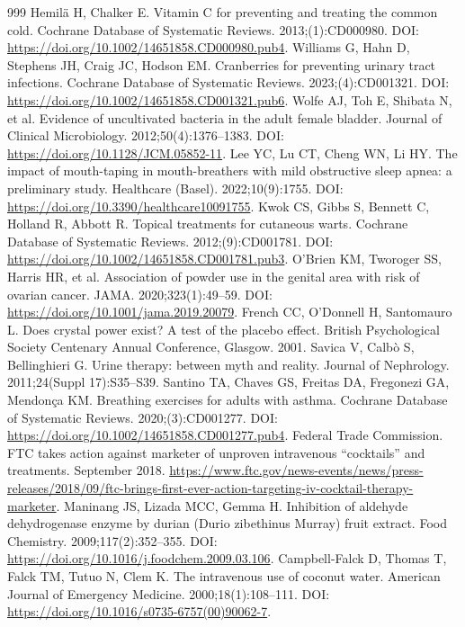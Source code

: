 \documentclass[11pt,oneside]{book}
\begin{document}
\begin{thebibliography}{999}
Hemil\"a H, Chalker E. Vitamin C for preventing and treating the common cold. Cochrane Database of Systematic Reviews. 2013;(1):CD000980. DOI: \url{https://doi.org/10.1002/14651858.CD000980.pub4}.
Williams G, Hahn D, Stephens JH, Craig JC, Hodson EM. Cranberries for preventing urinary tract infections. Cochrane Database of Systematic Reviews. 2023;(4):CD001321. DOI: \url{https://doi.org/10.1002/14651858.CD001321.pub6}.
Wolfe AJ, Toh E, Shibata N, et al. Evidence of uncultivated bacteria in the adult female bladder. Journal of Clinical Microbiology. 2012;50(4):1376--1383. DOI: \url{https://doi.org/10.1128/JCM.05852-11}.
Lee YC, Lu CT, Cheng WN, Li HY. The impact of mouth-taping in mouth-breathers with mild obstructive sleep apnea: a preliminary study. Healthcare (Basel). 2022;10(9):1755. DOI: \url{https://doi.org/10.3390/healthcare10091755}.
Kwok CS, Gibbs S, Bennett C, Holland R, Abbott R. Topical treatments for cutaneous warts. Cochrane Database of Systematic Reviews. 2012;(9):CD001781. DOI: \url{https://doi.org/10.1002/14651858.CD001781.pub3}.
O'Brien KM, Tworoger SS, Harris HR, et al. Association of powder use in the genital area with risk of ovarian cancer. JAMA. 2020;323(1):49--59. DOI: \url{https://doi.org/10.1001/jama.2019.20079}.
French CC, O'Donnell H, Santomauro L. Does crystal power exist? A test of the placebo effect. British Psychological Society Centenary Annual Conference, Glasgow. 2001.
Savica V, Calb\`o S, Bellinghieri G. Urine therapy: between myth and reality. Journal of Nephrology. 2011;24(Suppl 17):S35--S39.
Santino TA, Chaves GS, Freitas DA, Fregonezi GA, Mendon\c{c}a KM. Breathing exercises for adults with asthma. Cochrane Database of Systematic Reviews. 2020;(3):CD001277. DOI: \url{https://doi.org/10.1002/14651858.CD001277.pub4}.
Federal Trade Commission. FTC takes action against marketer of unproven intravenous ``cocktails'' and treatments. September 2018. \url{https://www.ftc.gov/news-events/news/press-releases/2018/09/ftc-brings-first-ever-action-targeting-iv-cocktail-therapy-marketer}.
Maninang JS, Lizada MCC, Gemma H. Inhibition of aldehyde dehydrogenase enzyme by durian (Durio zibethinus Murray) fruit extract. Food Chemistry. 2009;117(2):352--355. DOI: \url{https://doi.org/10.1016/j.foodchem.2009.03.106}.
Campbell-Falck D, Thomas T, Falck TM, Tutuo N, Clem K. The intravenous use of coconut water. American Journal of Emergency Medicine. 2000;18(1):108--111. DOI: \url{https://doi.org/10.1016/s0735-6757(00)90062-7}.

\end{thebibliography}
\end{document}
